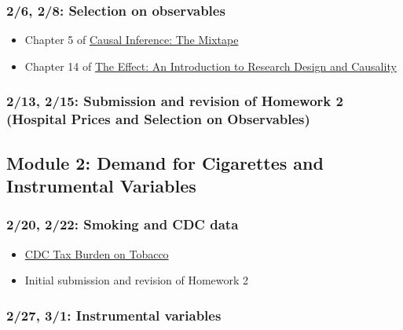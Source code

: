 \documentclass[11pt,]{article}
\providecommand{\tightlist}{%
  \setlength{\itemsep}{0pt}\setlength{\parskip}{0pt}}
\begin{document}
\hypertarget{selection-on-observables}{%
\subsubsection{2/6, 2/8: Selection on
observables}\label{selection-on-observables}}

\begin{itemize}
\tightlist
\item
  Chapter 5 of \href{https://mixtape.scunning.com/}{Causal Inference:
  The Mixtape}
\item
  Chapter 14 of \href{https://theeffectbook.net/}{The Effect: An
  Introduction to Research Design and Causality}
\end{itemize}

\hypertarget{submission-and-revision-of-homework-2-hospital-prices-and-selection-on-observables}{%
\subsubsection{2/13, 2/15: Submission and revision of Homework 2
(Hospital Prices and Selection on
Observables)}\label{submission-and-revision-of-homework-2-hospital-prices-and-selection-on-observables}}

\hypertarget{module-2-demand-for-cigarettes-and-instrumental-variables}{%
\subsection{Module 2: Demand for Cigarettes and Instrumental
Variables}\label{module-2-demand-for-cigarettes-and-instrumental-variables}}

\hypertarget{smoking-and-cdc-data}{%
\subsubsection{2/20, 2/22: Smoking and CDC
data}\label{smoking-and-cdc-data}}

\begin{itemize}
\tightlist
\item
  \href{https://github.com/imccart/CDC-Tobacco}{CDC Tax Burden on
  Tobacco}\\
\item
  Initial submission and revision of Homework 2
\end{itemize}

\hypertarget{instrumental-variables}{%
\subsubsection{2/27, 3/1: Instrumental
variables}\label{instrumental-variables}}
\end{document}
